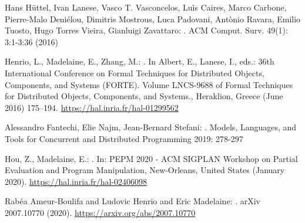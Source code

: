\documentclass[11pt,fleqn]{article}
\begin{document}
\begin{thebibliography}{9}

Hans H\"uttel, Ivan Lanese, Vasco T. Vasconcelos, Lu\`is Caires, Marco Carbone, Pierre-Malo Deni\'elou, Dimitris Mostrous, Luca Padovani, Ant\`onio Ravara, Emilio Tuosto, Hugo Torres Vieira, Gianluigi Zavattaro:
.
\newblock ACM Comput. Surv. 49(1): 3:1-3:36 (2016)



Henrio, L., Madelaine, E., Zhang, M.:
.
\newblock In Albert, E., Lanese, I., eds.: {36th International Conference on
  Formal Techniques for Distributed Objects, Components, and Systems (FORTE)}.
  Volume LNCS-9688 of Formal Techniques for Distributed Objects, Components,
  and Systems., Heraklion, Greece (June 2016)  175--194. 
\newblock  \url{https://hal.inria.fr/hal-01299562}

Alessandro Fantechi, Elie Najm, Jean-Bernard Stefani:
.
\newblock Models, Languages, and Tools for Concurrent and Distributed Programming 2019: 278-297



Hou, Z., Madelaine, E.:
.
\newblock In: {PEPM 2020 - ACM SIGPLAN Workshop on Partial Evaluation and
  Program Manipulation}, New-Orleans, United States (January 2020). 
 \newblock \url{https://hal.inria.fr/hal-02406098}

Rabéa Ameur-Boulifa and Ludovic Henrio and Eric Madelaine:
.
\newblock arXiv {2007.10770} (2020).
 \newblock \url{https://arxiv.org/abs/2007.10770}
\end{thebibliography}
\end{document}
